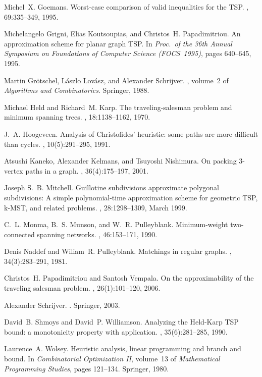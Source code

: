 \documentclass[letterpaper,11pt]{article}
\begin{document}
\begin{thebibliography}{10}
Michel~X. Goemans.
\newblock Worst-case comparison of valid inequalities for the {TSP}.
, 69:335--349, 1995.

Michelangelo Grigni, Elias Koutsoupias, and Christos~H. Papadimitriou.
\newblock An approximation scheme for planar graph {TSP}.
\newblock In {\em Proc.~of the 36th Annual Symposium on Foundations of Computer
  Science (FOCS~1995)}, pages 640--645, 1995.

Martin Gr{\"o}tschel, L{\'a}szlo Lov{\'a}sz, and Alexander Schrijver.
, volume~2
  of {\em Algorithms and Combinatorics}.
\newblock Springer, 1988.

Michael Held and Richard~M. Karp.
\newblock The traveling-salesman problem and minimum spanning trees.
, 18:1138--1162, 1970.

J.~A. Hoogeveen.
\newblock Analysis of {C}hristofides' heuristic: some paths are more difficult
  than cycles.
, 10(5):291--295, 1991.

Atsushi Kaneko, Alexander Kelmans, and Tsuyoshi Nishimura.
\newblock On packing 3-vertex paths in a graph.
, 36(4):175--197, 2001.

Joseph S.~B. Mitchell.
\newblock Guillotine subdivisions approximate polygonal subdivisions: A simple
  polynomial-time approximation scheme for geometric {TSP}, k-{MST}, and
  related problems.
, 28:1298--1309, March 1999.

C.~L. Monma, B.~S. Munson, and W.~R. Pulleyblank.
\newblock Minimum-weight two-connected spanning networks.
, 46:153--171, 1990.

Denis Naddef and Wiliam~R. Pulleyblank.
\newblock Matchings in regular graphs.
, 34(3):283--291, 1981.

Christos~H. Papadimitriou and Santosh Vempala.
\newblock On the approximability of the traveling salesman problem.
, 26(1):101--120, 2006.

Alexander Schrijver.
.
\newblock Springer, 2003.

David~B. Shmoys and David~P. Williamson.
\newblock Analyzing the {H}eld-{K}arp {TSP} bound: a monotonicity property with
  application.
, 35(6):281--285, 1990.

Laurence~A. Wolsey.
\newblock Heuristic analysis, linear programming and branch and bound.
\newblock In {\em Combinatorial Optimization II}, volume~13 of {\em
  Mathematical Programming Studies}, pages 121--134. Springer, 1980.

\end{thebibliography}
\pagebreak
\appendix
\end{document}
